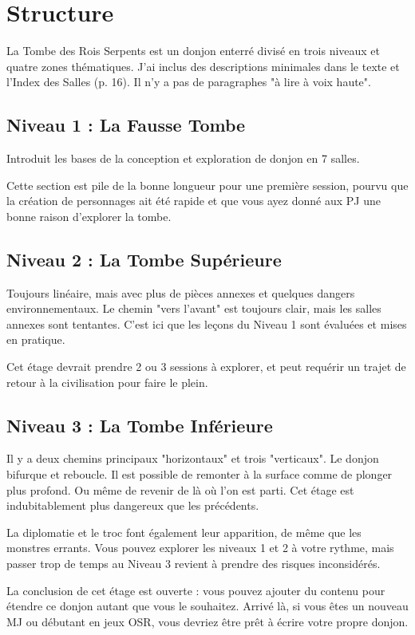 \section{Structure}
La Tombe des Rois Serpents est un donjon enterré divisé en trois niveaux et quatre zones thématiques.
J'ai inclus des descriptions minimales dans le texte et l'Index des Salles (p. 16).
Il n'y a pas de paragraphes "à lire à voix haute".

\subsection{Niveau 1 : La Fausse Tombe}
Introduit les bases de la conception et exploration de donjon en 7 salles.

Cette section est pile de la bonne longueur pour une première session, pourvu que la création de personnages ait été rapide et que vous ayez donné aux PJ une bonne raison d'explorer la tombe.

\subsection{Niveau 2 : La Tombe Supérieure}
Toujours linéaire, mais avec plus de pièces annexes et quelques dangers environnementaux.
Le chemin "vers l'avant" est toujours clair, mais les salles annexes sont tentantes.
C'est ici que les leçons du Niveau 1 sont évaluées et mises en pratique.

Cet étage devrait prendre 2 ou 3 sessions à explorer, et peut requérir un trajet de retour à la civilisation pour faire le plein.

\subsection{Niveau 3 : La Tombe Inférieure}
Il y a deux chemins principaux "horizontaux" et trois "verticaux".
Le donjon bifurque et reboucle.
Il est possible de remonter à la surface comme de plonger plus profond.
Ou même de revenir de là où l'on est parti.
Cet étage est indubitablement plus dangereux que les précédents.

La diplomatie et le troc font également leur apparition, de même que les monstres errants.
Vous pouvez explorer les niveaux 1 et 2 à votre rythme, mais passer trop de temps au Niveau 3 revient à prendre des risques inconsidérés.

La conclusion de cet étage est ouverte : vous pouvez ajouter du contenu pour étendre ce donjon autant que vous le souhaitez.
Arrivé là, si vous êtes un nouveau MJ ou débutant en jeux OSR, vous devriez être prêt à écrire votre propre donjon.

